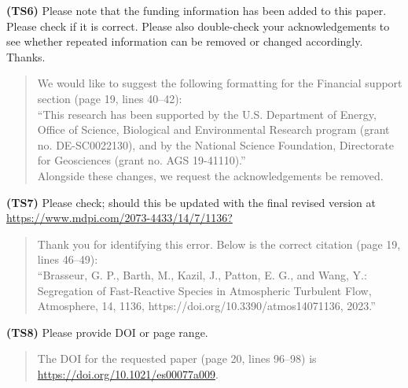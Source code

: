 \documentclass{article}
\begin{document}
\textbf{(TS6)} Please note that the funding information has been added to this paper. Please check if it is correct. Please also double-check your acknowledgements to see whether repeated information can be removed or changed accordingly. Thanks.

\begin{quote}
    We would like to suggest the following formatting for the Financial support section (page 19, lines 40--42): \\
    ``This research has been supported by the U.S. Department of Energy, Office of Science, Biological and Environmental Research program (grant no. DE-SC0022130), and by the National Science Foundation, Directorate for Geosciences (grant no. AGS 19-41110).'' \\ 

    Alongside these changes, we request the acknowledgements be removed. 
\end{quote}

\textbf{(TS7)} Please check; should this be updated with the final revised version at \url{https://www.mdpi.com/2073-4433/14/7/1136?}

\begin{quote}
    Thank you for identifying this error. Below is the correct citation (page 19, lines 46--49):\\
    ``Brasseur, G. P., Barth, M., Kazil, J., Patton, E. G., and
    Wang, Y.: Segregation of Fast-Reactive Species in
    Atmospheric Turbulent Flow, Atmosphere, 14, 1136,
    https://doi.org/10.3390/atmos14071136, 2023.''
\end{quote}

\textbf{(TS8)} Please provide DOI or page range.

\begin{quote}
    The DOI for the requested paper (page 20, lines 96--98) is \url{https://doi.org/10.1021/es00077a009}.
\end{quote}
\end{document}

